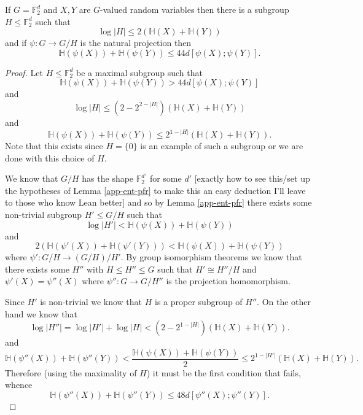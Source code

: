 \begin{lemma}\label{pfr-projection}\leanok
If $G=\mathbb{F}_2^d$ and $X,Y$ are $G$-valued random variables then there is a subgroup $H\leq \mathbb{F}_2^d$ such that
\[\log \lvert H\rvert \leq 2(\mathbb{H}(X)+\mathbb{H}(Y))\]
and if $\psi:G \to G/H$ is the natural projection then
\[\mathbb{H}(\psi(X))+\mathbb{H}(\psi(Y))\leq 44 d[\psi(X);\psi(Y)].\]
\end{lemma}
\begin{proof}
Let $H\leq \mathbb{F}_2^d$ be a maximal subgroup such that
\[\mathbb{H}(\psi(X))+\mathbb{H}(\psi(Y))> 44d[\psi(X);\psi(Y)]\]
and
\[\log \lvert H\rvert \leq \left(2-2^{2-\lvert H\rvert}\right)(\mathbb{H}(X)+\mathbb{H}(Y))\]
and
\[\mathbb{H}(\psi(X))+\mathbb{H}(\psi(Y))\leq 2^{1-\lvert H\rvert}(\mathbb{H}(X)+\mathbb{H}(Y)).\]
Note that this exists since $H=\{0\}$ is an example of such a subgroup or we are done with this choice of $H$.

We know that $G/H$ has the shape $\mathbb{F}_2^{d'}$ for some $d'$ [exactly how to see this/set up the hypotheses of Lemma \ref{app-ent-pfr} to make this an easy deduction I'll leave to those who know Lean better] and so by Lemma \ref{app-ent-pfr} there exists some non-trivial subgroup $H'\leq G/H$ such that
\[\log \lvert H'\rvert < \mathbb{H}(\psi(X))+\mathbb{H}(\psi(Y))\]
and
\[2(\mathbb{H}(\psi'(X))+\mathbb{H}(\psi'(Y)))< \mathbb{H}(\psi(X))+\mathbb{H}(\psi(Y))\]
where $\psi':G/H\to (G/H)/H'$. By group isomorphism theorems we know that there exists some $H''$ with $H\leq H''\leq G$ such that $H'\cong H''/H$ and $\psi'(X)=\psi''(X)$ where $\psi'':G\to G/H''$ is the projection homomorphism.

Since $H'$ is non-trivial we know that $H$ is a proper subgroup of $H''$. On the other hand we know that
\[\log \lvert H''\rvert=\log \lvert H'\rvert+\log \lvert H\rvert< (2-2^{1-\lvert H\rvert})(\mathbb{H}(X)+\mathbb{H}(Y)).\]
and
\[\mathbb{H}(\psi''(X))+\mathbb{H}(\psi''(Y))< \frac{\mathbb{H}(\psi(X))+\mathbb{H}(\psi(Y))}{2}\leq 2^{1-\lvert H'\rvert}(\mathbb{H}(X)+\mathbb{H}(Y)).\]
Therefore (using the maximality of $H$) it must be the first condition that fails, whence
\[\mathbb{H}(\psi''(X))+\mathbb{H}(\psi''(Y))\leq 48d[\psi''(X);\psi''(Y)].\]
\end{proof}


